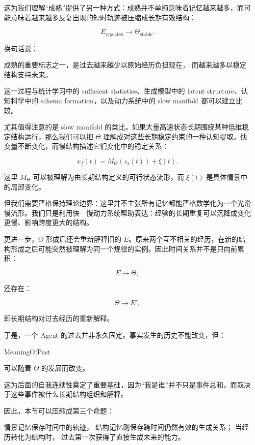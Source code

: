 这为我们理解“成熟”提供了另一种方式：成熟并不单纯意味着记忆越来越多，而可能意味着越来越多反复出现的短时轨迹被压缩成长期有效结构：

\[
E_{\mathrm{repeated}}
\rightarrow
\Theta_{\mathrm{stable}}.
\]

换句话说：

\begin{statementbox}
成熟的重要标志之一，是过去越来越少以原始经历负担现在，
而越来越多以稳定结构支持未来。
\end{statementbox}

这一过程与统计学习中的 sufficient statistics、生成模型中的 latent structure、认知科学中的 schema formation，以及动力系统中的 slow manifold 都可以建立比较。

尤其值得注意的是 slow manifold 的类比。如果大量高速状态长期围绕某种低维稳定结构运行，那么我们可以把 $\Theta$ 理解成对这些长期稳定约束的一种认知提取。快变量不断变化，而慢结构描述它们变化中的稳定关系：

\[
x_f(t)
=
M_{\Theta}(z_s(t))
+
\xi(t).
\]

这里 $M_{\Theta}$ 可以被理解为由长期结构定义的可行状态流形，而 $\xi(t)$ 是具体情景中的局部变化。

但我们需要严格保持理论边界：这里并不主张所有记忆都能严格数学化为一个光滑慢流形。我们只是利用快—慢动力系统帮助表达：经验的长期重复可以沉降成变化更慢、影响跨度更大的结构。

更进一步，$\Theta$ 形成后还会重新解释旧的 $E$。原来两个互不相关的经历，在新的结构形成之后可能突然被理解为同一个规律的实例。因此时间关系并不是只向前累积：

\[
E
\rightarrow
\Theta,
\]

还存在：

\[
\Theta
\rightarrow
E',
\]

即长期结构对过去经历的重新解释。

于是，一个 Agent 的过去并非永久固定。事实发生的历史不能改变，但：

\begin{statementbox}
MeaningOfPast
\end{statementbox}

可以随着 $\Theta$ 的发展而改变。

这为后面的自我连续性奠定了重要基础，因为“我是谁”并不只是事件总和，而取决于这些事件被什么长期结构组织和解释。

因此，本节可以压缩成第三个命题：

\begin{proposition*}
情景记忆保存时间中的轨迹，
结构记忆则保存跨时间仍然有效的生成关系；
当经历转化为结构时，
过去第一次获得了直接生成未来的能力。
\end{proposition*}

